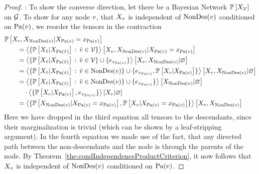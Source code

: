 \begin{proof}
	\proofleftsymbol:
	To show the converse direction, let there be a Bayesian Network $\mathbb{P}\left[X_{\mathcal{V}}\right]$ on $\mathcal{G}$.
	To show for any node $v$, that $X_{v}$ is independent of $\mathrm{NonDes}(v)$ conditioned on $\mathrm{Pa}(v)$, we reorder the tensors in the contraction
	\begin{align*}
		& \condprobof{\catvariableof{\node},\catvariableof{\nondescendantsof{\node}}}{\indexedcatvariableof{\parentsof{\node}}} \\
		& \quad\quad = \normationofwrt{
			\{\condprobof{\catvariableof{\secnode}}{\catvariableof{\parentsof{\secnode}}} \, : \, \secnode\in\nodes\}
		}
		{\catvariableof{\node},\catvariableof{\nondescendantsof{\node}}}
		{\indexedcatvariableof{\parentsof{\node}}} \\
		& \quad\quad  = \normationof{
			\{\condprobof{\catvariableof{\secnode}}{\catvariableof{\parentsof{\secnode}}} \, : \, \secnode\in\nodes\} \cup \{\onehotmapof{\catindexof{\parentsof{\node}}}\}
		}
		{\catvariableof{\node},\catvariableof{\nondescendantsof{\node}}}\\
		&  \quad\quad = \normationof{
			\{\condprobof{\catvariableof{\secnode}}{\catvariableof{\parentsof{\secnode}}} \, : \, \secnode\in\nondescendantsof{\node}\} \cup \{\onehotmapof{\catindexof{\parentsof{\node}}}, \condprobof{\catvariableof{\node}}{\catvariableof{\parentsof{\node}}} \}
		}
		{\catvariableof{\node},\catvariableof{\nondescendantsof{\node}}} \\
		&  \quad\quad =  %
		 \normationof{
			\{\condprobof{\catvariableof{\secnode}}{\catvariableof{\parentsof{\secnode}}} \, : \, \secnode\in\nondescendantsof{\node}\} \cup \{\onehotmapof{\catindexof{\parentsof{\node}}}\}
		}
		{\catvariableof{\nondescendantsof{\node}}} \\
		& \quad\quad  \quad  \cdot \normationof{
			\{\condprobof{\catvariableof{\node}}{\catvariableof{\parentsof{\node}}},\onehotmapof{\catindexof{\parentsof{\node}}}\}
		}
		{\catvariableof{\node}} \\
		& \quad\quad  = \contractionof{\{
		\condprobof{\catvariableof{\nondescendantsof{\node}}}{\indexedcatvariableof{\parentsof{\node}}},
		\condprobof{\catvariableof{\node}}{\indexedcatvariableof{\parentsof{\node}}}
		\}}{\catvariableof{\node},\catvariableof{\nondescendantsof{\node}}}
	\end{align*}
	Here we have dropped in the third equation all tensors to the descendants, since their marginalization is trivial (which can be shown by a leaf-stripping argument).
	In the fourth equation we made use of the fact, that any directed path between the non-descendants and the node is through the parents of the node.
	By Theorem~\ref{the:condIndependenceProductCriterion}, it now follows that $X_{v}$ is independent of $\mathrm{NonDes}(v)$ conditioned on $\mathrm{Pa}(v)$.
\end{proof}

